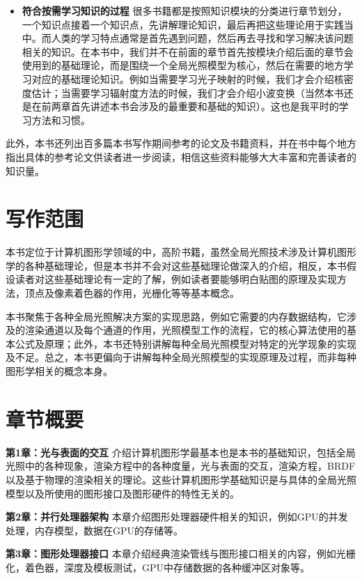 \begin{itemize}
	\item \textbf{符合按需学习知识的过程 } 很多书籍都是按照知识模块的分类进行章节划分，一个知识点接着一个知识点，先讲解理论知识，最后再把这些理论用于实践当中。而人类的学习特点通常是首先遇到问题，然后再去寻找和学习解决该问题相关的知识。在本书中，我们并不在前面的章节首先按模块介绍后面的章节会使用到的基础理论，而是围绕一个全局光照模型为核心，然后在需要的地方学习对应的基础理论知识。例如当需要学习光子映射的时候，我们才会介绍核密度估计；当需要学习辐射度方法的时候，我们才会介绍小波变换（当然本书还是在前两章首先讲述本书会涉及的最重要和基础的知识）。这也是我平时的学习方法和习惯。
\end{itemize}

此外，本书还列出百多篇本书写作期间参考的论文及书籍资料，并在书中每个地方指出具体的参考论文供读者进一步阅读，相信这些资料能够大大丰富和完善读者的知识量。



\section*{写作范围}
本书定位于计算机图形学领域的中，高阶书籍，虽然全局光照技术涉及计算机图形学的各种基础理论，但是本书并不会对这些基础理论做深入的介绍，相反，本书假设读者对这些基础理论有一定的了解，例如读者要能够明白贴图的原理及实现方法，顶点及像素着色器的作用，光栅化等等基本概念。

本书聚焦于各种全局光照解决方案的实现思路，例如它需要的内存数据结构，它涉及的渲染通道以及每个通道的作用，光照模型工作的流程，它的核心算法使用的基本公式及原理；此外，本书还特别讲解每种全局光照模型对特定的光学现象的实现及不足。总之，本书更偏向于讲解每种全局光照模型的实现原理及过程，而非每种图形学相关的概念本身。




\section*{章节概要}
\textbf{第1章：光与表面的交互 } 介绍计算机图形学最基本也是本书的基础知识，包括全局光照中的各种现象，渲染方程中的各种度量，光与表面的交互，渲染方程，BRDF以及基于物理的渲染相关的理论。这些计算机图形学基础知识是与具体的全局光照模型以及所使用的图形接口及图形硬件的特性无关的。

\textbf{第2章：并行处理器架构 } 本章介绍图形处理器硬件相关的知识，例如GPU的并发处理，内存模型，数据在GPU的存储等。

\textbf{第3章：图形处理器接口 } 本章介绍经典渲染管线与图形接口相关的内容，例如光栅化，着色器，深度及模板测试，GPU中存储数据的各种缓冲区对象等。

